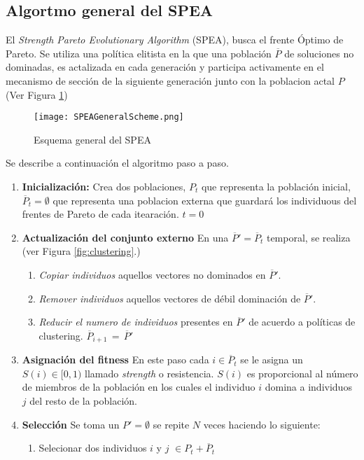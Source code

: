\documentclass[10pt,onecolumn,twoside,letterpaper]{article}
\begin{document}
\begin{multicols}{2}
\section{Algortmo general del SPEA}
El \emph{Strength Pareto Evolutionary Algorithm} (SPEA), busca el frente \'Optimo de Pareto. Se utiliza una pol\'itica elitista en la que una poblaci\'on $\overline{P}$ de soluciones no dominadas, es actalizada en cada generaci\'on y participa activamente en el mecanismo de secci\'on de la siguiente generaci\'on junto con la poblacion actal $P$ (Ver Figura \ref{fig:SPEAScheme})
\begin{figure}[H]
  \centering
  \texttt{[image: SPEAGeneralScheme.png]}
  \caption{Esquema general del SPEA}
  \label{fig:SPEAScheme}
\end{figure}
\par Se describe a continuaci\'on el algoritmo paso a paso.
\begin{enumerate}
\item \textbf{Inicializaci\'on:} Crea dos poblaciones, $P_t$ que representa la poblaci\'on inicial, $\overline{P}_t=\emptyset$ que representa una poblacion externa que guardar\'a los individuous del frentes de Pareto de cada itearaci\'on. $t=0$
\item \textbf{Actualizaci\'on del conjunto externo} En una $\overline{P}'=\overline{P}_t$ temporal, se realiza (ver Figura \ref{fig:clustering}.)
  \begin{enumerate}
  \item \textit{Copiar individuos} aquellos vectores no dominados en $\overline{P}'$.
  \item \textit{Remover individuos} aquellos vectores de d\'ebil dominaci\'on de $\overline{P}'$.
  \item \textit{Reducir el numero de individuos} presentes en $\overline{P}'$ de acuerdo a pol\'iticas de clustering. $\overline{P}_{i+1}\,=\,\overline{P}'$
  \end{enumerate}
\item \textbf{Asignaci\'on del fitness} En este paso cada $i\in\overline{P}_t$ se le asigna un $S(i)\in[0,1)$ llamado \emph{strength} o resistencia. $S(i)$ es proporcional al n\'umero de miembros de la poblaci\'on en los cuales el individuo $i$ domina a individuos $j$ del resto de la poblaci\'on.
\item \textbf{Selecci\'on} Se toma un $P'=\emptyset$ se repite $N$ veces haciendo lo siguiente:
  \begin{enumerate}
  \item Selecionar dos individuos $i$ y $j$ $\in P_t+\overline{P}_t$ 

\end{enumerate}
\end{enumerate}
\end{multicols}
\end{document}
